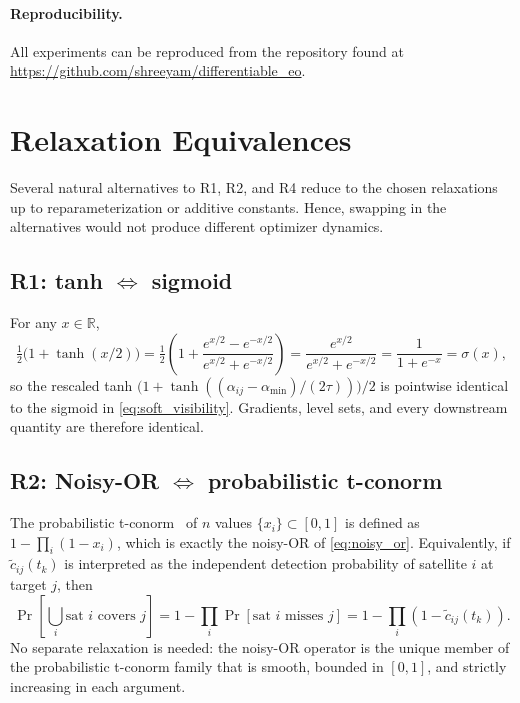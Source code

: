 \paragraph{Reproducibility.}
All experiments can be reproduced from the repository found at \url{https://github.com/shreeyam/differentiable_eo}.

\section{Relaxation Equivalences}
\label{app:alternatives}

Several natural alternatives to R1, R2, and R4 reduce to the chosen relaxations up to reparameterization or additive constants. Hence, swapping in the alternatives would not produce different optimizer dynamics.

\subsection{R1: tanh $\Leftrightarrow$ sigmoid}

For any $x \in \mathbb{R}$,
\begin{equation}
    \tfrac{1}{2}\bigl(1 + \tanh(x/2)\bigr)
    = \tfrac{1}{2}\left(1 + \frac{e^{x/2} - e^{-x/2}}{e^{x/2} + e^{-x/2}}\right)
    = \frac{e^{x/2}}{e^{x/2} + e^{-x/2}}
    = \frac{1}{1 + e^{-x}}
    = \sigma(x),
    \label{eq:tanh_sigmoid}
\end{equation}
so the rescaled tanh $\bigl(1 + \tanh((\alpha_{ij} - \alpha_{\min})/(2\tau))\bigr)/2$ is pointwise identical to the sigmoid in \eqref{eq:soft_visibility}.
Gradients, level sets, and every downstream quantity are therefore identical.

\subsection{R2: Noisy-OR $\Leftrightarrow$ probabilistic t-conorm}

The probabilistic t-conorm~\citep{klement_triangular_2000} of $n$ values $\{x_i\} \subset [0,1]$ is defined as $1 - \prod_i (1 - x_i)$, which is exactly the noisy-OR of \eqref{eq:noisy_or}.
Equivalently, if $\tilde{c}_{ij}(t_k)$ is interpreted as the independent detection probability of satellite $i$ at target $j$, then
\begin{equation}
    \Pr\!\left[\bigcup_i \text{sat } i \text{ covers } j\right]
    = 1 - \prod_i \Pr\!\left[\text{sat } i \text{ misses } j\right]
    = 1 - \prod_i (1 - \tilde{c}_{ij}(t_k)).
    \label{eq:noisy_or_derivation}
\end{equation}
No separate relaxation is needed: the noisy-OR operator is the unique member of the probabilistic t-conorm family that is smooth, bounded in $[0,1]$, and strictly increasing in each argument.

